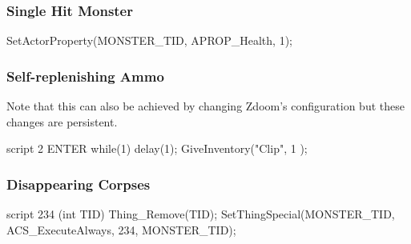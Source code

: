 		\subsubsection*{Single Hit Monster}
			\begin{clinee}
SetActorProperty(MONSTER_TID, APROP_Health, 1);
			\end{clinee}
		\subsubsection*{Self-replenishing Ammo}
		Note that this can also be achieved by changing Zdoom's configuration but these changes are persistent.
			\begin{clinee}
script 2 ENTER
{   
    while(1)
    {
        delay(1);
        GiveInventory("Clip", 1 );
    }
}
			\end{clinee}
		\subsubsection*{Disappearing Corpses}
			\begin{clinee}
script 234 (int TID)
{
	Thing_Remove(TID);
}
SetThingSpecial(MONSTER_TID, ACS_ExecuteAlways, 234, MONSTER_TID);
			\end{clinee}
